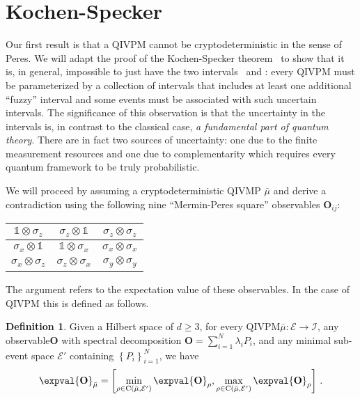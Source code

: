 \documentclass[english,reprint, aps, prl,superscriptaddress, showpacs,
showkeys, longbibliography, amsmath, amssymb]{revtex4-1}
\theoremstyle{plain}
\theoremstyle{definition}
\newtheorem{definition}[thm]{Definition}
\newcommand{\events}{\ensuremath{\mathcal{E}}}
\newcommand{\imposs}{{\text{\wesa{impossible}}}}
\newcommand{\necess}{{\text{\wesa{certain}}}}
\newcommand{\coreBorn}{\ensuremath{\mathrm{C}}}
\newcommand{\nb}{\nolinebreak[1] }
\begin{document}
\section{Kochen-Specker} 
  \label{sec:Kochen-Specker}
  
Our first result is that a QIVPM cannot be cryptodeterministic in the
sense of Peres\nb\cite{PeresRon1988,peres1995quantum}. We will adapt
the proof of the Kochen-Specker theorem~\cite{kochenspecker1967,
  peres1995quantum,Redhead1987-REDINA,Griffiths2003} to show that it
is, in general, impossible to just have the two intervals \imposs\ and
\necess: every QIVPM must be parameterized by a collection of
intervals that includes at least one additional ``fuzzy'' interval and
some events must be associated with such uncertain intervals. The
significance of this observation is that the uncertainty in the
intervals is, in contrast to the classical case, \emph{a fundamental
  part of quantum theory}. There are in fact two sources of
uncertainty: one due to the finite measurement resources and one due
to complementarity which requires every quantum framework to be truly
probabilistic.

We will proceed by assuming a cryptodeterministic QIVMP $\bar{\mu}$
and derive a contradiction using the following nine ``Mermin-Peres square''
observables $\mathbf{O}_{ij}$\nb\cite{Mermin1990Simple,peres1995quantum}:
\begin{center}
\begin{tabular}{|c|c|c|}
\hline 
$\mathbb{1}\otimes\sigma_{z}$  & $\sigma_{z}\otimes\mathbb{1}$  & $\sigma_{z}\otimes\sigma_{z}$ \tabularnewline
\hline 
$\sigma_{x}\otimes\mathbb{1}$  & $\mathbb{1}\otimes\sigma_{x}$  & $\sigma_{x}\otimes\sigma_{x}$ \tabularnewline
\hline 
$\sigma_{x}\otimes\sigma_{z}$  & $\sigma_{z}\otimes\sigma_{x}$  & $\sigma_{y}\otimes\sigma_{y}$ \tabularnewline
\hline 
\end{tabular}
\par\end{center}

\noindent The argument refers to the expectation value of these
observables. In the case of QIVPM this is defined as follows. 

\begin{definition}Given a Hilbert space of $d\ge3$, for every
  QIVPM\nb$\bar{\mu}:\events\rightarrow\mathscr{I}$, any
  observable\nb$\mathbf{O}$ with spectral decomposition
  $\mathbf{O}=\sum_{i=1}^{N}\lambda_{i}P_{i}$, and any minimal
  sub-event space $\events'$ containing
  $\left\{ P_{i}\right\} _{i=1}^{N}$, we have
\begin{equation}
\expval{\mathbf{O}}_{\bar{\mu}}=\left[\min_{\rho\in\coreBorn\left(\bar{\mu},\events'\right)}\expval{\mathbf{O}}_{\rho},\max_{\rho\in\coreBorn\left(\bar{\mu},\events'\right)}\expval{\mathbf{O}}_{\rho}\right]\,.\label{eq:quantum-interval-expectation-core}
\end{equation}
\end{definition}
\end{document}
